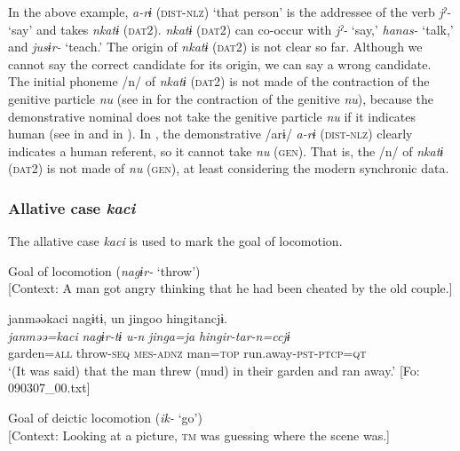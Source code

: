 In the above example, \textit{a-rɨ} (\textsc{dist}-\textsc{nlz}) ‘that person’ is the addressee of the verb \textit{jˀ-} ‘say’ and takes \textit{nkatɨ} (\textsc{dat}2). \textit{nkatɨ} (\textsc{dat2}) can co-occur with \textit{jˀ-} ‘say,’ \textit{hanas-} ‘talk,’ and \textit{jusɨr-} ‘teach.’ The origin of \textit{nkatɨ} (\textsc{dat2}) is not clear so far. Although we cannot say the correct candidate for its origin, we can say a wrong candidate. The initial phoneme /n/ of \textit{nkatɨ} (\textsc{dat2}) is not made of the contraction of the genitive particle \textit{nu} (see  in  for the contraction of the genitive \textit{nu}), because the demonstrative nominal does not take the genitive particle \textit{nu} if it indicates human (see  in  and  in ). In , the demonstrative /arɨ/ \textit{a-rɨ} (\textsc{dist}-\textsc{nlz}) clearly indicates a human referent, so it cannot take \textit{nu} (\textsc{gen}). That is, the /n/ of \textit{nkatɨ} (\textsc{dat2}) is not made of \textit{nu} (\textsc{gen}), at least considering the modern synchronic data.

\subsubsection{Allative case \textit{kaci}}

The allative case \textit{kaci} is used to mark the goal of locomotion.

\ea\label{ex:6-59}
\ea Goal of locomotion (\textit{nagɨr-} ‘throw’)\\{}
[Context: A man got angry thinking that he had been cheated by the old couple.]

{\TM}
\glll janməəkaci  nagɨtɨ,  un  jingoo  hingitancjɨ.\\
      \textit{janməə=kaci}  \textit{nagɨr-tɨ}  \textit{u-n}  \textit{jinga=ja}  \textit{hingir-tar-n=ccjɨ}\\
      garden=\textsc{all}  throw-\textsc{seq}  \textsc{mes}-\textsc{adnz}  man=\textsc{top}  run.away-\textsc{pst}-\textsc{ptcp}=\textsc{qt}\\
\glt ‘(It was said) that the man threw (mud) in their garden and ran away.’ [Fo: 090307\_00.txt]

\ex Goal of deictic locomotion (\textit{ik-} ‘go’)\\{}
[Context: Looking at a picture, \textsc{tm} was guessing where the scene was.]

